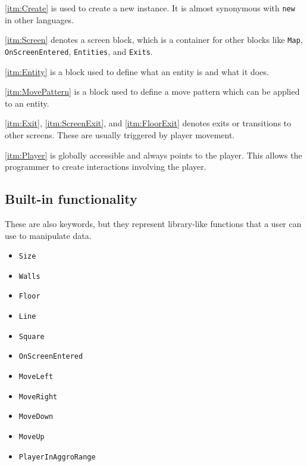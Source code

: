 \ref{itm:Create} is used to create a new instance. It is almost synonymous with \verb|new| in other languages.

\ref{itm:Screen} denotes a screen block, which is a container for other blocks like \verb|Map|, \verb|OnScreenEntered|, \verb|Entities|, and \verb|Exits|.

\ref{itm:Entity} is a block used to define what an entity is and what it does.

\ref{itm:MovePattern} is a block used to define a move pattern which can be applied to an entity.

\ref{itm:Exit}, \ref{itm:ScreenExit}, and \ref{itm:FloorExit} denotes exits or transitions to other screens. These are usually triggered by player movement.

\ref{itm:Player} is globally accessible and always points to the player. This allows the programmer to create interactions involving the player. 
    
\subsection{Built-in functionality}
These are also keywords, but they represent library-like functions that a user can use to manipulate data.
\begin{multicols}{3}
    \begin{itemize}
        \item \texttt{Size}
        \item \texttt{Walls}
        \item \texttt{Floor}
        \item \texttt{Line}
        \item \texttt{Square}
        \item \texttt{OnScreenEntered}
        \item \texttt{MoveLeft}
        \item \texttt{MoveRight}
        \item \texttt{MoveDown}
        \item \texttt{MoveUp}
        \item \texttt{PlayerInAggroRange}
    \end{itemize}
\end{multicols}

